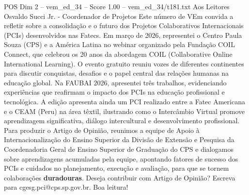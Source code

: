 \begin{textsample}{POS Dim 2 – vem\_ed\_34 – Score 1.00 – vem\_ed\_34/t181.txt}  \label{ex:f2_pos_008}
Aos Leitores Osvaldo Succi Jr. - Coordenador de Projetos Este número de VEm convida a refletir sobre a consolidação e o futuro dos Projetos Colaborativos Internacionais (PCIs) desenvolvidos nas Fatecs.
Em março de 2026, representei o Centro Paula Souza (CPS) e a América Latina no webinar organizado pela Fundação COIL Connect, que celebrou os 20 anos da abordagem COIL (Collaborative Online International Learning).
O evento gratuito reuniu vozes de diferentes continentes para discutir conquistas, desafios e o papel central das relações humanas na educação global.
Na FAUBAI 2026, apresentei três trabalhos, evidenciando experiências que reafirmam o impacto dos PCIs na educação profissional e tecnológica.
A edição apresenta ainda um PCI realizado entre a Fatec Americana e o CEAM (Peru) na área têxtil, ilustrando como o Intercâmbio Virtual promove aprendizagem significativa, diálogo intercultural e desenvolvimento profissional.
Para produzir o Artigo de Opinião, reunimos a equipe de Apoio à Internacionalização do Ensino Superior da Divisão de Extensão e Pesquisa da Coordenadoria Geral de Ensino Superior de Graduação do CPS e dialogamos sobre aprendizagens acumuladas pela equipe, apontando fatores de sucesso dos PCIs e cuidados no planejamento, execução e avaliação, para que se tornem colaborações \textbf{duradouras}.
Deseja contribuir com Artigo de Opinião?
Escreva para cgesg.pci@cps.sp.gov.br.
Boa leitura!

\end{textsample}
